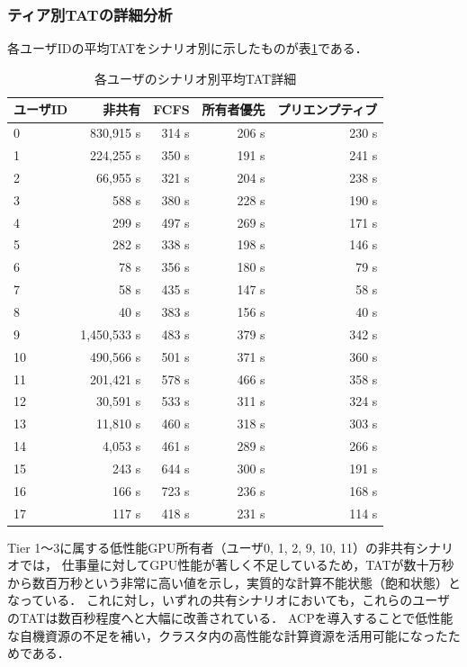 \documentclass[12pt,a4paper]{jsarticle}
\begin{document}
\subsubsection{ティア別TATの詳細分析}

各ユーザIDの平均TATをシナリオ別に示したものが表\ref{tab:tat_detail}である．

\begin{table}[h]
  \centering
  \caption{各ユーザのシナリオ別平均TAT詳細}
  \label{tab:tat_detail}
  \small
  \begin{tabular}{lrrrr}
    \toprule
    ユーザID & 非共有 & FCFS & 所有者優先 & プリエンプティブ \\
    \midrule
    0  & 830{,}915 s & 314 s & 206 s & 230 s \\
    1  & 224{,}255 s & 350 s & 191 s & 241 s \\
    2  &  66{,}955 s & 321 s & 204 s & 238 s \\
    3  &     588 s   & 380 s & 228 s & 190 s \\
    4  &     299 s   & 497 s & 269 s & 171 s \\
    5  &     282 s   & 338 s & 198 s & 146 s \\
    6  &      78 s   & 356 s & 180 s &  79 s \\
    7  &      58 s   & 435 s & 147 s &  58 s \\
    8  &      40 s   & 383 s & 156 s &  40 s \\
    9  & 1{,}450{,}533 s & 483 s & 379 s & 342 s \\
    10 &   490{,}566 s & 501 s & 371 s & 360 s \\
    11 &   201{,}421 s & 578 s & 466 s & 358 s \\
    12 &    30{,}591 s & 533 s & 311 s & 324 s \\
    13 &    11{,}810 s & 460 s & 318 s & 303 s \\
    14 &     4{,}053 s & 461 s & 289 s & 266 s \\
    15 &       243 s   & 644 s & 300 s & 191 s \\
    16 &       166 s   & 723 s & 236 s & 168 s \\
    17 &       117 s   & 418 s & 231 s & 114 s \\
    \bottomrule
  \end{tabular}
\end{table}

Tier 1〜3に属する低性能GPU所有者（ユーザ0, 1, 2, 9, 10, 11）の非共有シナリオでは，
仕事量に対してGPU性能が著しく不足しているため，TATが数十万秒から数百万秒という非常に高い値を示し，実質的な計算不能状態（飽和状態）となっている．
これに対し，いずれの共有シナリオにおいても，これらのユーザのTATは数百秒程度へと大幅に改善されている．
ACPを導入することで低性能な自機資源の不足を補い，クラスタ内の高性能な計算資源を活用可能になったためである．
\end{document}
